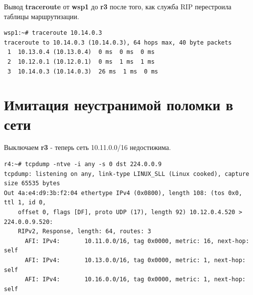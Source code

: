 \documentclass[a4paper,12pt]{article}
\begin{document}
Вывод \textbf{traceroute} от \textbf{wsp1} до \textbf{r3} после того, как служба RIP перестроила таблицы маршрутизации.

\begin{Verbatim}
wsp1:~# traceroute 10.14.0.3
traceroute to 10.14.0.3 (10.14.0.3), 64 hops max, 40 byte packets
 1  10.13.0.4 (10.13.0.4)  0 ms  0 ms  0 ms
 2  10.12.0.1 (10.12.0.1)  0 ms  1 ms  1 ms
 3  10.14.0.3 (10.14.0.3)  26 ms  1 ms  0 ms
\end{Verbatim}

\section{Имитация неустранимой поломки в сети}

Выключаем \textbf{r3} - теперь сеть 10.11.0.0/16 недостижима.

\begin{Verbatim}
r4:~# tcpdump -ntve -i any -s 0 dst 224.0.0.9
tcpdump: listening on any, link-type LINUX_SLL (Linux cooked), capture size 65535 bytes
Out 4a:e4:d9:3b:f2:04 ethertype IPv4 (0x0800), length 108: (tos 0x0, ttl 1, id 0,
    offset 0, flags [DF], proto UDP (17), length 92) 10.12.0.4.520 > 224.0.0.9.520: 
	RIPv2, Response, length: 64, routes: 3
	  AFI: IPv4:       10.11.0.0/16, tag 0x0000, metric: 16, next-hop: self
	  AFI: IPv4:       10.13.0.0/16, tag 0x0000, metric: 1, next-hop: self
	  AFI: IPv4:       10.16.0.0/16, tag 0x0000, metric: 1, next-hop: self
\end{Verbatim}
\end{document}
